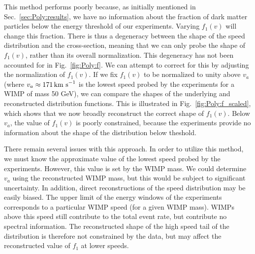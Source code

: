 This method performs poorly because, as initially mentioned in Sec.~\ref{sec:Poly:results}, we have no information about the fraction of dark matter particles below the energy threshold of our experiments. Varying $f_1(v)$ will change this fraction. There is thus a degeneracy between the shape of the speed distribution and the cross-section, meaning that we can only probe the shape of $f_1(v)$, rather than its overall normalization. This degeneracy has not been accounted for in Fig.~\ref{fig:Poly:f}. We can attempt to correct for this by adjusting the normalization of $f_1(v)$. If we fix $f_1(v)$ to be normalized to unity above $v_a$ (where $v_a \approx 171 \,\textrm{km s}^{-1}$ is the lowest speed probed by the experiments for a WIMP of mass 50 GeV), we can compare the shapes of the underlying and reconstructed distribution functions. This is illustrated in Fig.~\ref{fig:Poly:f_scaled}, which shows that we now broadly reconstruct the correct shape of $f_1(v)$. Below $v_a$, the value of $f_1(v)$ is poorly constrained, because the experiments provide no information about the shape of the distribution below theshold.

There remain several issues with this approach. In order to utilize this method, we must know the approximate value of the lowest speed probed by the experiments. However, this value is set by the WIMP mass. We could determine $v_a$ using the reconstructed WIMP mass, but this would be subject to significant uncertainty. In addition, direct reconstructions of the speed distribution may be easily biased. The upper limit of the energy windows of the experiments corresponds to a particular WIMP speed (for a given WIMP mass). WIMPs above this speed still contribute to the total event rate, but contribute no spectral information. The reconstructed shape of the high speed tail of the distribution is therefore not constrained by the data, but may affect the reconstructed value of $f_1$ at lower speeds.


